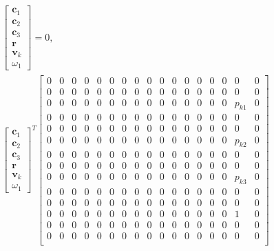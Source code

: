 \documentclass{article}
\begin{document}
\begin{align}
    \begin{bmatrix}
        \mathbf{c}_1 \\
        \mathbf{c}_2 \\
        \mathbf{c}_3 \\
        \mathbf{r} \\
        \mathbf{v}_k \\
        \omega_1
    \end{bmatrix} = 0, \\
    \begin{bmatrix}
        \mathbf{c}_1 \\
        \mathbf{c}_2 \\
        \mathbf{c}_3 \\
        \mathbf{r} \\
        \mathbf{v}_k \\
        \omega_1
    \end{bmatrix}^T 
    \begin{bmatrix}
        0 & 0 & 0 & 0 & 0 & 0 & 0 & 0 & 0 & 0 & 0 & 0 & 0 & 0 & 0 & 0 & 0 \\
        0 & 0 & 0 & 0 & 0 & 0 & 0 & 0 & 0 & 0 & 0 & 0 & 0 & 0 & 0 & 0 & 0 \\
        0 & 0 & 0 & 0 & 0 & 0 & 0 & 0 & 0 & 0 & 0 & 0 & 0 & 0 & 0 & p_{k1} & 0 \\
        0 & 0 & 0 & 0 & 0 & 0 & 0 & 0 & 0 & 0 & 0 & 0 & 0 & 0 & 0 & 0 & 0 \\
        0 & 0 & 0 & 0 & 0 & 0 & 0 & 0 & 0 & 0 & 0 & 0 & 0 & 0 & 0 & 0 & 0 \\
        0 & 0 & 0 & 0 & 0 & 0 & 0 & 0 & 0 & 0 & 0 & 0 & 0 & 0 & 0 & p_{k2} & 0 \\
        0 & 0 & 0 & 0 & 0 & 0 & 0 & 0 & 0 & 0 & 0 & 0 & 0 & 0 & 0 & 0 & 0 \\
        0 & 0 & 0 & 0 & 0 & 0 & 0 & 0 & 0 & 0 & 0 & 0 & 0 & 0 & 0 & 0 & 0 \\
        0 & 0 & 0 & 0 & 0 & 0 & 0 & 0 & 0 & 0 & 0 & 0 & 0 & 0 & 0 & p_{k3} & 0 \\
        0 & 0 & 0 & 0 & 0 & 0 & 0 & 0 & 0 & 0 & 0 & 0 & 0 & 0 & 0 & 0 & 0 \\
        0 & 0 & 0 & 0 & 0 & 0 & 0 & 0 & 0 & 0 & 0 & 0 & 0 & 0 & 0 & 0 & 0 \\
        0 & 0 & 0 & 0 & 0 & 0 & 0 & 0 & 0 & 0 & 0 & 0 & 0 & 0 & 0 & 1 & 0 \\
        0 & 0 & 0 & 0 & 0 & 0 & 0 & 0 & 0 & 0 & 0 & 0 & 0 & 0 & 0 & 0 & 0 \\
        0 & 0 & 0 & 0 & 0 & 0 & 0 & 0 & 0 & 0 & 0 & 0 & 0 & 0 & 0 & 0 & 0 \\

\end{bmatrix}
\end{align}
\end{document}
